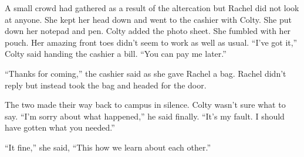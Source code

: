 A small crowd had gathered as a result of the altercation but Rachel did not look at anyone. She
kept her head down and went to the cashier with Colty. She put down her notepad and pen. Colty
added the photo sheet. She fumbled with her pouch. Her amazing front toes didn't seem to work as
well as usual. ``I've got it,'' Colty said handing the cashier a bill. ``You can pay me later.''

``Thanks for coming,'' the cashier said as she gave Rachel a bag. Rachel didn't reply but
instead took the bag and headed for the door.

The two made their way back to campus in silence. Colty wasn't sure what to say. ``I'm sorry
about what happened,'' he said finally. ``It's my fault. I should have gotten what you needed.''

``It fine,'' she said, ``This how we learn about each other.''
